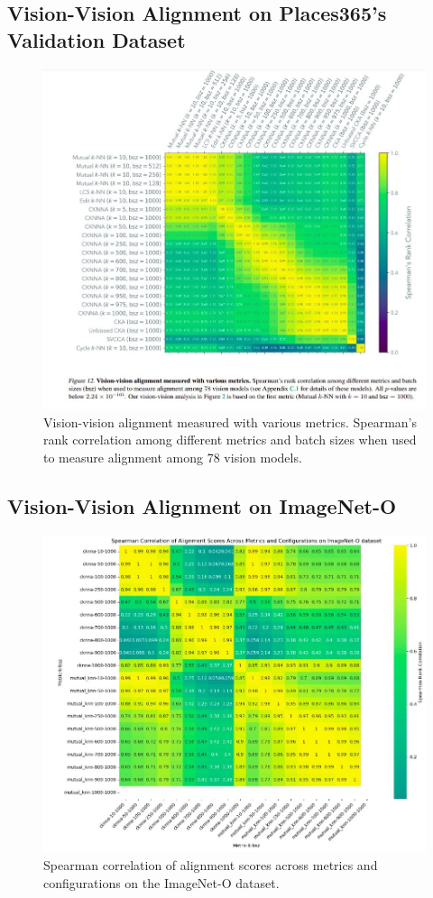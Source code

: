 \documentclass[10pt,a4paper]{article}
\begin{document}
\subsection{Vision-Vision Alignment on Places365’s Validation Dataset}
\begin{figure}[H]
    \centering
    \includegraphics[width=\textwidth]{prh_correlation.jpg}
    \caption{Vision-vision alignment measured with various metrics. Spearman's rank correlation among different metrics and batch sizes when used to measure alignment among 78 vision models.}
    \label{fig:prh_correlation}
\end{figure}

\subsection{Vision-Vision Alignment on ImageNet-O}
\begin{figure}[H]
    \centering
    \includegraphics[width=\textwidth]{prh_correlation_ood.jpg}
    \caption{Spearman correlation of alignment scores across metrics and configurations on the ImageNet-O dataset.}
    \label{fig:prh_correlation_ood}
\end{figure}
\end{document}
